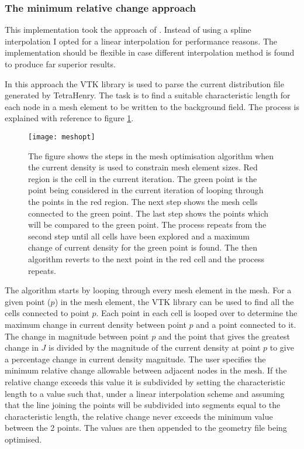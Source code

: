\subsubsection*{The minimum relative change approach}
This implementation took the approach of \cite{fluxNoiseSquidsStevenAnton}. Instead of using a spline interpolation I opted for a linear interpolation for performance reasons. The implementation should be flexible in case different interpolation method is found to produce far superior results. \par
In this approach the VTK library is used to parse the current distribution file generated by TetraHenry. The task is to find a suitable characteristic length for each node in a mesh element to be written to the background field. The process is explained with reference to figure \ref{fig:meshopt}.
\begin{figure}[H]
    \centering
    \texttt{[image: meshopt]}
    \caption{The figure shows the steps in the mesh optimisation algorithm when the current density is used to constrain mesh element sizes. Red region is the cell in the current iteration. The green point is the point being considered in the current iteration of looping through the points in the red region. The next step shows the mesh cells connected to the green point. The last step shows the points which will be compared to the green point. The process repeats from the second step until all cells have been explored and a maximum change of current density for the green point is found. The then algorithm reverts to the next point in the red cell and the process repeats.}
    \label{fig:meshopt}
\end{figure}
The algorithm starts by looping through every mesh element in the mesh. For a given point ($p$) in the mesh element, the VTK library can be used to find all the cells connected to point $p$. Each point in each cell is looped over to determine the maximum change in current density between point $p$ and a point connected to it. The change in magnitude between point $p$ and the point that gives the greatest change in $J$ is divided by the magnitude of the current density at point $p$ to give a percentage change in current density magnitude. The user specifies the minimum relative change allowable between adjacent nodes in the mesh. If the relative change exceeds this value it is subdivided by setting the characteristic length to a value such that, under a linear interpolation scheme and assuming that the line joining the points will be subdivided into segments equal to the characteristic length, the relative change never exceeds the minimum value between the 2 points. The values are then appended to the geometry file being optimised.

